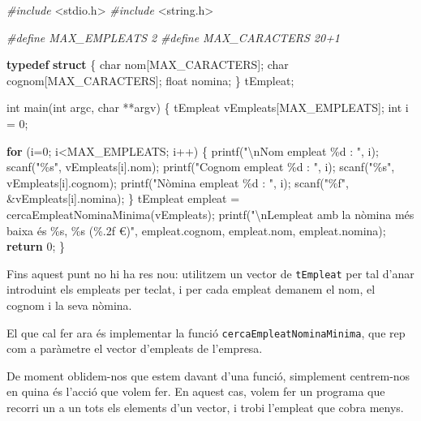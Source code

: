 \documentclass[
]{book}
\newenvironment{Shaded}{\begin{snugshade}}{\end{snugshade}}
\newcommand{\ControlFlowTok}[1]{\textcolor[rgb]{0.13,0.29,0.53}{\textbf{#1}}}
\newcommand{\DataTypeTok}[1]{\textcolor[rgb]{0.13,0.29,0.53}{#1}}
\newcommand{\DecValTok}[1]{\textcolor[rgb]{0.00,0.00,0.81}{#1}}
\newcommand{\ImportTok}[1]{#1}
\newcommand{\KeywordTok}[1]{\textcolor[rgb]{0.13,0.29,0.53}{\textbf{#1}}}
\newcommand{\NormalTok}[1]{#1}
\newcommand{\PreprocessorTok}[1]{\textcolor[rgb]{0.56,0.35,0.01}{\textit{#1}}}
\newcommand{\SpecialCharTok}[1]{\textcolor[rgb]{0.00,0.00,0.00}{#1}}
\newcommand{\StringTok}[1]{\textcolor[rgb]{0.31,0.60,0.02}{#1}}
\begin{document}
\begin{Shaded}
\begin{Highlighting}[]
\PreprocessorTok{\#include }\ImportTok{\textless{}stdio.h\textgreater{}}
\PreprocessorTok{\#include }\ImportTok{\textless{}string.h\textgreater{}}

\PreprocessorTok{\#define MAX\_EMPLEATS 2}
\PreprocessorTok{\#define MAX\_CARACTERS 20+1}

\KeywordTok{typedef} \KeywordTok{struct}\NormalTok{ \{}
    \DataTypeTok{char}\NormalTok{ nom[MAX\_CARACTERS];}
    \DataTypeTok{char}\NormalTok{ cognom[MAX\_CARACTERS];}
    \DataTypeTok{float}\NormalTok{ nomina;}
\NormalTok{\} tEmpleat;}

\DataTypeTok{int}\NormalTok{ main(}\DataTypeTok{int}\NormalTok{ argc, }\DataTypeTok{char}\NormalTok{ **argv) \{}
\NormalTok{    tEmpleat vEmpleats[MAX\_EMPLEATS];}
    \DataTypeTok{int}\NormalTok{ i = }\DecValTok{0}\NormalTok{;}

    \ControlFlowTok{for}\NormalTok{ (i=}\DecValTok{0}\NormalTok{; i\textless{}MAX\_EMPLEATS; i++) \{}
\NormalTok{        printf(}\StringTok{"}\SpecialCharTok{\textbackslash{}n}\StringTok{Nom empleat \%d : "}\NormalTok{, i);}
\NormalTok{        scanf(}\StringTok{"\%s"}\NormalTok{, vEmpleats[i].nom);}
\NormalTok{        printf(}\StringTok{"Cognom empleat \%d : "}\NormalTok{, i);}
\NormalTok{        scanf(}\StringTok{"\%s"}\NormalTok{, vEmpleats[i].cognom);}
\NormalTok{        printf(}\StringTok{"Nòmina empleat \%d : "}\NormalTok{, i);}
\NormalTok{        scanf(}\StringTok{"\%f"}\NormalTok{, \&vEmpleats[i].nomina);}
\NormalTok{    \}}
\NormalTok{    tEmpleat empleat = cercaEmpleatNominaMinima(vEmpleats);}
\NormalTok{    printf(}\StringTok{"}\SpecialCharTok{\textbackslash{}n}\StringTok{L\textquotesingle{}empleat amb la nòmina més baixa és \%s, \%s (\%.2f €)"}\NormalTok{, empleat.cognom, empleat.nom, empleat.nomina);}
    \ControlFlowTok{return} \DecValTok{0}\NormalTok{;}
\NormalTok{\}}
\end{Highlighting}
\end{Shaded}

Fins aquest punt no hi ha res nou: utilitzem un vector de \texttt{tEmpleat} per tal d'anar introduint els empleats per teclat, i per cada empleat demanem el nom, el cognom i la seva nòmina.

El que cal fer ara és implementar la funció \texttt{cercaEmpleatNominaMinima}, que rep com a paràmetre el vector d'empleats de l'empresa.

De moment oblidem-nos que estem davant d'una funció, simplement centrem-nos en quina és l'acció que volem fer. En aquest cas, volem fer un programa que recorri un a un tots els elements d'un vector, i trobi l'empleat que cobra menys.
\end{document}
